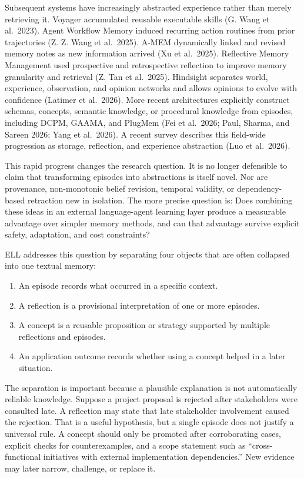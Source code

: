 \documentclass[
  english,
  a4paper,
  DIV=11,
  numbers=noendperiod]{scrreprt}
\providecommand{\tightlist}{%
  \setlength{\itemsep}{0pt}\setlength{\parskip}{0pt}}
\begin{document}
Subsequent systems have increasingly abstracted experience rather than
merely retrieving it. Voyager accumulated reusable executable skills (G.
Wang et al.~2023). Agent Workflow Memory induced recurring action
routines from prior trajectories (Z. Z. Wang et al.~2025). A-MEM
dynamically linked and revised memory notes as new information arrived
(Xu et al.~2025). Reflective Memory Management used prospective and
retrospective reflection to improve memory granularity and retrieval (Z.
Tan et al.~2025). Hindsight separates world, experience, observation,
and opinion networks and allows opinions to evolve with confidence
(Latimer et al.~2026). More recent architectures explicitly construct
schemas, concepts, semantic knowledge, or procedural knowledge from
episodes, including DCPM, GAAMA, and PlugMem (Fei et al.~2026; Paul,
Sharma, and Sareen 2026; Yang et al.~2026). A recent survey describes
this field-wide progression as storage, reflection, and experience
abstraction (Luo et al.~2026).

This rapid progress changes the research question. It is no longer
defensible to claim that transforming episodes into abstractions is
itself novel. Nor are provenance, non-monotonic belief revision,
temporal validity, or dependency-based retraction new in isolation. The
more precise question is: Does combining these ideas in an external
language-agent learning layer produce a measurable advantage over
simpler memory methods, and can that advantage survive explicit safety,
adaptation, and cost constraints?

ELL addresses this question by separating four objects that are often
collapsed into one textual memory:

\begin{enumerate}
\def\labelenumi{\arabic{enumi}.}
\tightlist
\item
  An episode records what occurred in a specific context.
\item
  A reflection is a provisional interpretation of one or more episodes.
\item
  A concept is a reusable proposition or strategy supported by multiple
  reflections and episodes.
\item
  An application outcome records whether using a concept helped in a
  later situation.
\end{enumerate}

The separation is important because a plausible explanation is not
automatically reliable knowledge. Suppose a project proposal is rejected
after stakeholders were consulted late. A reflection may state that late
stakeholder involvement caused the rejection. That is a useful
hypothesis, but a single episode does not justify a universal rule. A
concept should only be promoted after corroborating cases, explicit
checks for counterexamples, and a scope statement such as
``cross-functional initiatives with external implementation
dependencies.'' New evidence may later narrow, challenge, or replace it.
\end{document}
